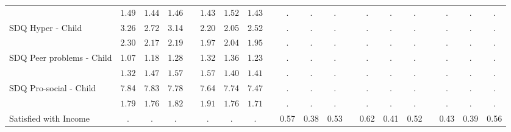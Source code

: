 \begin{landscape}
\begin{center}
{\begin{longtable}{L{5cm} c c c p{.5cm} c c c p{.5cm} c c c p{.5cm} c c c p{.5cm} c c c}
& $\mathit{     1.49}$ & $\mathit{     1.44}$ & $\mathit{     1.46}$ & & $\mathit{     1.43}$ & $\mathit{     1.52}$ & $\mathit{     1.43}$ & & $\mathit{        .}$ & $\mathit{        .}$ & $\mathit{        .}$ & & $\mathit{        .}$ & $\mathit{        .}$ & $\mathit{        .}$ & & $\mathit{        .}$ & $\mathit{        .}$ & $\mathit{        .}$ \\[1.6em]
SDQ Hyper - Child & 3.26 &      2.72 &      3.14 & &      2.20 &      2.05 &      2.52 & &         . &         . &         . & &         . &         . &         . & &         . &         . &         . \\*
& $\mathit{     2.30}$ & $\mathit{     2.17}$ & $\mathit{     2.19}$ & & $\mathit{     1.97}$ & $\mathit{     2.04}$ & $\mathit{     1.95}$ & & $\mathit{        .}$ & $\mathit{        .}$ & $\mathit{        .}$ & & $\mathit{        .}$ & $\mathit{        .}$ & $\mathit{        .}$ & & $\mathit{        .}$ & $\mathit{        .}$ & $\mathit{        .}$ \\[1.6em]
SDQ Peer problems - Child & 1.07 &      1.18 &      1.28 & &      1.32 &      1.36 &      1.23 & &         . &         . &         . & &         . &         . &         . & &         . &         . &         . \\*
& $\mathit{     1.32}$ & $\mathit{     1.47}$ & $\mathit{     1.57}$ & & $\mathit{     1.57}$ & $\mathit{     1.40}$ & $\mathit{     1.41}$ & & $\mathit{        .}$ & $\mathit{        .}$ & $\mathit{        .}$ & & $\mathit{        .}$ & $\mathit{        .}$ & $\mathit{        .}$ & & $\mathit{        .}$ & $\mathit{        .}$ & $\mathit{        .}$ \\[1.6em]
SDQ Pro-social - Child & 7.84 &      7.83 &      7.78 & &      7.64 &      7.74 &      7.47 & &         . &         . &         . & &         . &         . &         . & &         . &         . &         . \\*
& $\mathit{     1.79}$ & $\mathit{     1.76}$ & $\mathit{     1.82}$ & & $\mathit{     1.91}$ & $\mathit{     1.76}$ & $\mathit{     1.71}$ & & $\mathit{        .}$ & $\mathit{        .}$ & $\mathit{        .}$ & & $\mathit{        .}$ & $\mathit{        .}$ & $\mathit{        .}$ & & $\mathit{        .}$ & $\mathit{        .}$ & $\mathit{        .}$ \\[1.6em]
Satisfied with Income & . &         . &         . & &         . &         . &         . & &      0.57 &      0.38 &      0.53 & &      0.62 &      0.41 &      0.52 & &      0.43 &      0.39 &      0.56 \\*

\end{longtable}}
\end{center}
\end{landscape}
